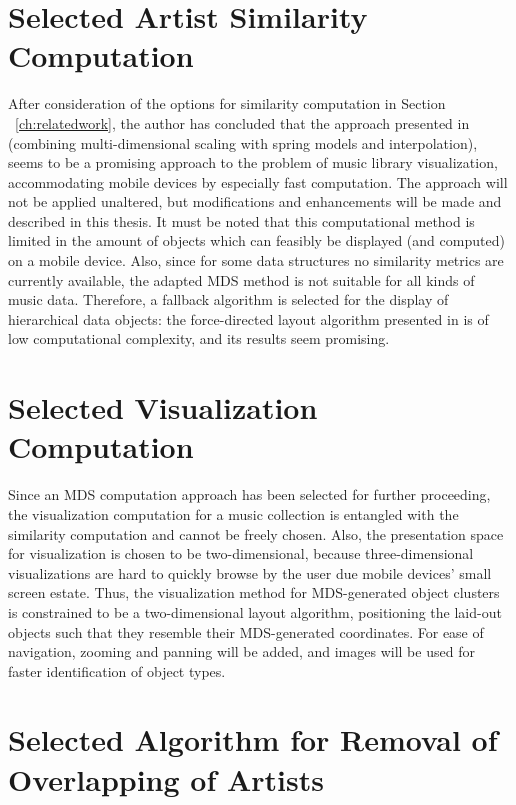 \section{Selected Artist Similarity Computation}

After consideration of the options for similarity computation in Section ~\ref{ch:relatedwork}, the author has concluded that the approach presented in \cite{Morrison:2003:FMS} (combining multi-dimensional scaling with spring models and interpolation), seems to be a promising approach to the problem of music library visualization, accommodating mobile devices by especially fast computation. The approach will not be applied unaltered, but modifications and enhancements will be made and described in this thesis. 
It must be noted that this computational method is limited in the amount of objects which can feasibly be displayed (and computed) on a mobile device. Also, since for some data structures no similarity metrics are currently available, the adapted MDS method is not suitable for all kinds of music data. Therefore, a fallback algorithm is selected for the display of hierarchical data objects: the force-directed layout algorithm presented in \cite{Kobourov04} is of low computational complexity, and its results seem promising.

\section{Selected Visualization Computation}

Since an MDS computation approach has been selected for further proceeding, the visualization computation for a music collection is entangled with the similarity computation and cannot be freely chosen. Also, the presentation space for visualization is chosen to be two-dimensional, because three-dimensional visualizations are hard to quickly browse by the user due mobile devices' small screen estate. Thus, the visualization method for MDS-generated object clusters is constrained to be a two-dimensional layout algorithm, positioning the laid-out objects such that they resemble their MDS-generated coordinates. For ease of navigation, zooming and panning will be added, and images will be used for faster identification of object types.

\section{Selected Algorithm for Removal of Overlapping of Artists}

